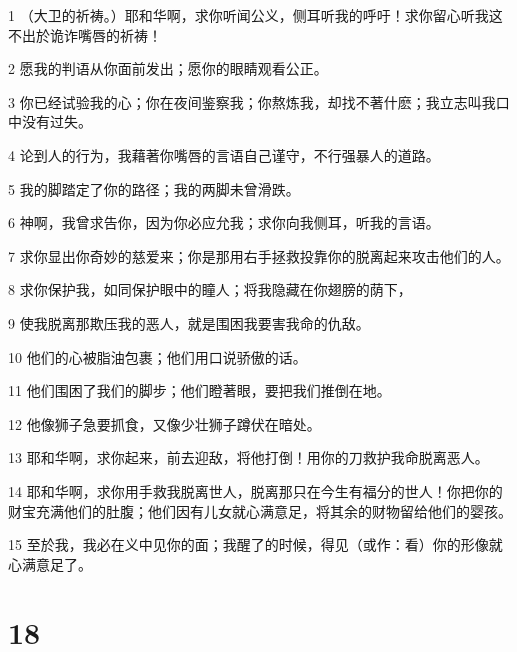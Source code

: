\par 1 （大卫的祈祷。）耶和华啊，求你听闻公义，侧耳听我的呼吁！求你留心听我这不出於诡诈嘴唇的祈祷！
\par 2 愿我的判语从你面前发出；愿你的眼睛观看公正。
\par 3 你已经试验我的心；你在夜间鉴察我；你熬炼我，却找不著什麽；我立志叫我口中没有过失。
\par 4 论到人的行为，我藉著你嘴唇的言语自己谨守，不行强暴人的道路。
\par 5 我的脚踏定了你的路径；我的两脚未曾滑跌。
\par 6 神啊，我曾求告你，因为你必应允我；求你向我侧耳，听我的言语。
\par 7 求你显出你奇妙的慈爱来；你是那用右手拯救投靠你的脱离起来攻击他们的人。
\par 8 求你保护我，如同保护眼中的瞳人；将我隐藏在你翅膀的荫下，
\par 9 使我脱离那欺压我的恶人，就是围困我要害我命的仇敌。
\par 10 他们的心被脂油包裹；他们用口说骄傲的话。
\par 11 他们围困了我们的脚步；他们瞪著眼，要把我们推倒在地。
\par 12 他像狮子急要抓食，又像少壮狮子蹲伏在暗处。
\par 13 耶和华啊，求你起来，前去迎敌，将他打倒！用你的刀救护我命脱离恶人。
\par 14 耶和华啊，求你用手救我脱离世人，脱离那只在今生有福分的世人！你把你的财宝充满他们的肚腹；他们因有儿女就心满意足，将其余的财物留给他们的婴孩。
\par 15 至於我，我必在义中见你的面；我醒了的时候，得见（或作：看）你的形像就心满意足了。

\chapter{18}

